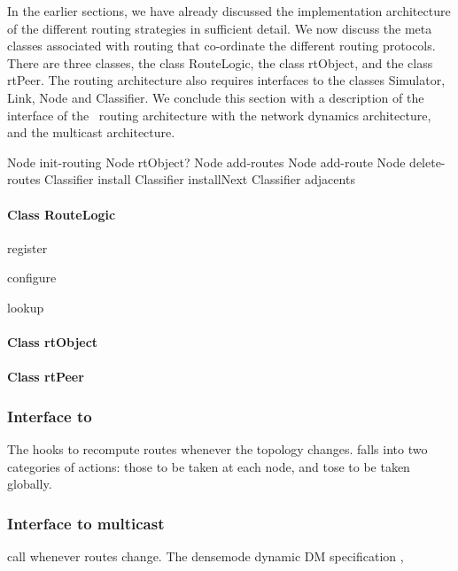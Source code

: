 \documentclass{article}
\begin{document}
In the earlier sections,
we have already discussed the implementation architecture
of the different routing strategies in sufficient detail.
We now discuss the meta classes associated with routing
that co-ordinate the different routing protocols.
There are three classes,
the class RouteLogic, the class rtObject, and the class rtPeer.
The routing architecture also requires interfaces to
the classes Simulator, Link, Node and Classifier.
We conclude this section with a description of the
interface of the \ns\  routing architecture with
the network dynamics architecture, and the multicast architecture.


Node init-routing
Node rtObject?
Node add-routes
Node add-route
Node delete-routes
Classifier install
Classifier installNext
Classifier adjacents

\paragraph{Class RouteLogic}

register

configure

lookup


\paragraph{Class rtObject}
\paragraph{Class rtPeer}

\subsubsection{Interface to \rtglib}
\label{sec:rtglibAPI}
The hooks to recompute routes whenever the topology changes.
falls into two categories of actions:
those to be taken at each node, and tose to be taken globally.

\subsubsection{Interface to multicast}
\label{sec:mcastAPI}

call whenever routes change.
The densemode dynamic DM specification ,
\end{document}
